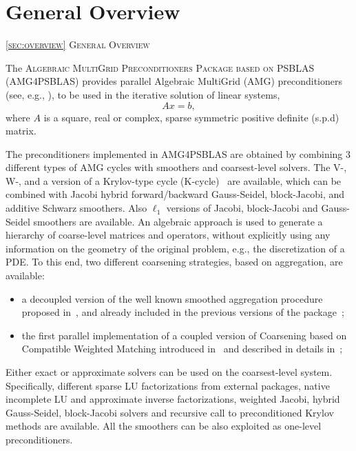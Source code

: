 \section{General Overview\label{sec:overview}}
         {\textsc{\ref{sec:overview} General Overview}}

The \textsc{Algebraic MultiGrid Preconditioners Package based on
PSBLAS (AMG4PSBLAS)} provides parallel Algebraic MultiGrid (AMG) preconditioners (see, e.g., \cite{Briggs2000,Stuben_01}),
to be used in the iterative solution of  linear systems,
\begin{equation}
Ax=b,
\label{system1}
\end{equation}
where $A$ is a square, real or complex, sparse symmetric positive definite (s.p.d) matrix.
%
%

The preconditioners implemented in AMG4PSBLAS are obtained by combining
3 different types of AMG cycles with smoothers and coarsest-level solvers. The V-, W-, and a version of a Krylov-type cycle (K-cycle)~\cite{Briggs2000,Notay2008} are available, which can be combined with Jacobi hybrid
forward/backward Gauss-Seidel, block-Jacobi, and additive Schwarz smoothers. Also $\ell_1$ versions of Jacobi, block-Jacobi and Gauss-Seidel smoothers are available.
An algebraic approach is used to generate a hierarchy of
coarse-level matrices and operators, without explicitly using any information on the
geometry of the original problem, e.g., the discretization of a PDE. To this end,
two different coarsening strategies, based on aggregation, are available:
\begin{itemize}
\item a decoupled version of the well known smoothed aggregation procedure proposed in~\cite{BREZINA_VANEK,VANEK_MANDEL_BREZINA}, and already included in the previous versions of the package~\cite{BDDF2007,MLD2P4_TOMS};
\item the first parallel implementation of a coupled version of Coarsening based on Compatible Weighted Matching introduced in~\cite{DV2013,DFV2018} and described in details in~\cite{DDF2020};
\end{itemize}

Either exact or approximate solvers can be used on the coarsest-level system. Specifically, different sparse LU factorizations from external
packages, native incomplete LU and approximate inverse factorizations, weighted Jacobi, hybrid Gauss-Seidel, block-Jacobi solvers and recursive call to preconditioned Krylov methods are available. All the smoothers can be also exploited as one-level
preconditioners.


